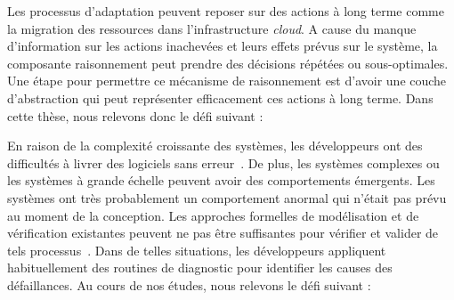 %
Les processus d'adaptation peuvent reposer sur des actions à long terme comme la migration des ressources dans l'infrastructure \textit{cloud}. 
A cause du manque d'information sur les actions inachevées et leurs effets prévus sur le système, la composante raisonnement peut prendre des décisions répétées ou sous-optimales. Une étape pour permettre ce mécanisme de raisonnement est d'avoir une couche d'abstraction qui peut représenter efficacement ces actions à long terme. Dans cette thèse, nous relevons donc le défi suivant :
\vspace{-2em}


%
En raison de la complexité croissante des systèmes, les développeurs ont des difficultés à livrer des logiciels sans erreur~\cite{DBLP:conf/icse/BarbosaLMJ17, DBLP:conf/icse/MongielloPS15, DBLP:conf/icse/HassanBB15}.
De plus, les systèmes complexes ou les systèmes à grande échelle peuvent avoir des comportements émergents. 
Les systèmes ont très probablement un comportement anormal qui n'était pas prévu au moment de la conception. 
Les approches formelles de modélisation et de vérification existantes peuvent ne pas être suffisantes pour vérifier et valider de tels processus~\cite{DBLP:conf/icse/TaharaOH17}. 
Dans de telles situations, les développeurs appliquent habituellement des routines de diagnostic pour identifier les causes des défaillances.
Au cours de nos études, nous relevons le défi suivant :
\vspace{-2em}
